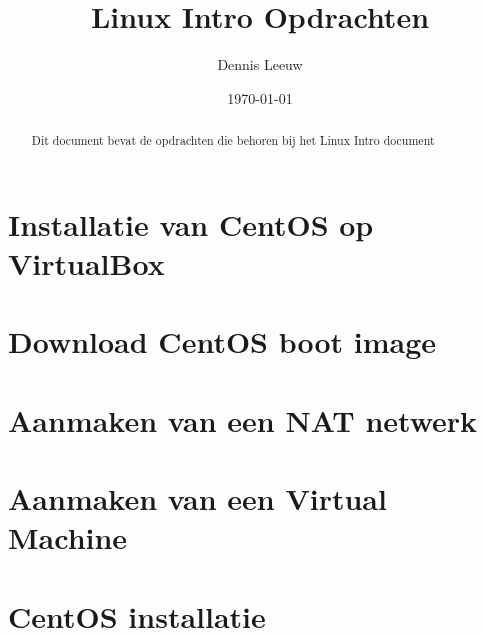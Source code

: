 \documentclass[12pt, a4paper, twoside]{article}
\title{Linux Intro Opdrachten}
\author{Dennis Leeuw}
\date{\today}
\begin{document}
\begin{titlepage}
\maketitle
\end{titlepage}

\begin{abstract}
Dit document bevat de opdrachten die behoren bij het Linux Intro document
\end{abstract}

\section{Installatie van CentOS op VirtualBox}

\section{Download CentOS boot image}

\section{Aanmaken van een NAT netwerk}

\section{Aanmaken van een Virtual Machine}

\section{CentOS installatie}

\end{document}
